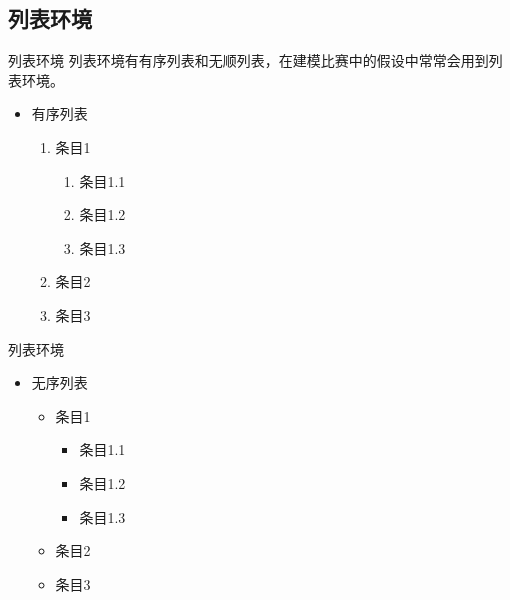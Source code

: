 \subsection{列表环境}
\begin{frame}[fragile]{列表环境}
列表环境有有序列表和无顺列表，在建模比赛中的假设中常常会用到列表环境。
\begin{itemize}
\item 有序列表
\bigskip
\begin{LTXexample}[pos=r]
\begin{enumerate}
\item 条目1
\begin{enumerate}
\item 条目1.1
\item 条目1.2
\item 条目1.3
\end{enumerate}
\item 条目2
\item 条目3
\end{enumerate}\end{LTXexample}
\end{itemize}
\end{frame}

\begin{frame}[fragile]{列表环境}
\begin{itemize}
\item 无序列表
\bigskip
\begin{LTXexample}[pos=r]
\begin{itemize}
\item 条目1
\begin{itemize}
\item 条目1.1
\item 条目1.2
\item 条目1.3
\end{itemize}
\item 条目2
\item 条目3
\end{itemize}\end{LTXexample}
\end{itemize}
\end{frame}


